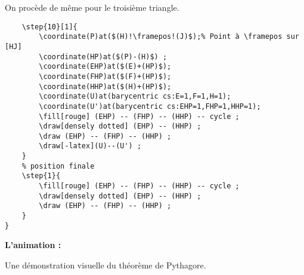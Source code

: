 \documentclass[a4paper,12pt]{article}
\begin{document}
On procède de même pour le troisième triangle.

\begin{lstlisting}[name=exemplecomplet]
	% déplacement du troisième triangle
	\step{10}[1]{
		\coordinate(P)at($(H)!\framepos!(J)$);% Point à \framepos sur [HJ]
		\coordinate(HP)at($(P)-(H)$) ;
		\coordinate(EHP)at($(E)+(HP)$);
		\coordinate(FHP)at($(F)+(HP)$);
		\coordinate(HHP)at($(H)+(HP)$);
		\coordinate(U)at(barycentric cs:E=1,F=1,H=1);
		\coordinate(U')at(barycentric cs:EHP=1,FHP=1,HHP=1);
		\fill[rouge] (EHP) -- (FHP) -- (HHP) -- cycle ;
		\draw[densely dotted] (EHP) -- (HHP) ;
		\draw (EHP) -- (FHP) -- (HHP) ;
		\draw[-latex](U)--(U') ;
	}
	% position finale
	\step{1}{
		\fill[rouge] (EHP) -- (FHP) -- (HHP) -- cycle ;
		\draw[densely dotted] (EHP) -- (HHP) ;
		\draw (EHP) -- (FHP) -- (HHP) ;
	}
}
\end{lstlisting}

\textbf{L'animation :}

Une démonstration visuelle du théorème de Pythagore.
\end{document}
